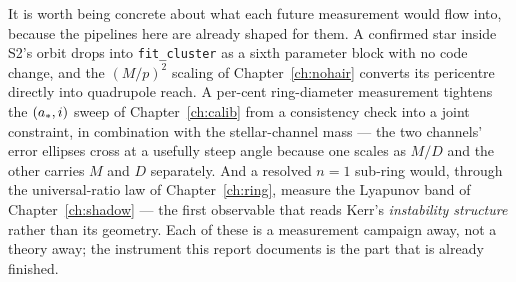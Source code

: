 It is worth being concrete about what each future measurement would
flow into, because the pipelines here are already shaped for them.
A confirmed star inside S2's orbit drops into \texttt{fit\_cluster}
as a sixth parameter block with no code change, and the
$(M/p)^2$ scaling of Chapter~\ref{ch:nohair} converts its pericentre
directly into quadrupole reach. A per-cent ring-diameter measurement
tightens the $(a_*, i)$ sweep of Chapter~\ref{ch:calib} from a
consistency check into a joint constraint, in combination with the
stellar-channel mass — the two channels' error ellipses cross at a
usefully steep angle because one scales as $M/D$ and the other
carries $M$ and $D$ separately. And a resolved $n = 1$ sub-ring
would, through the universal-ratio law of Chapter~\ref{ch:ring},
measure the Lyapunov band of Chapter~\ref{ch:shadow} — the first
observable that reads Kerr's \emph{instability structure} rather
than its geometry. Each of these is a measurement campaign away, not
a theory away; the instrument this report documents is the part that
is already finished.
